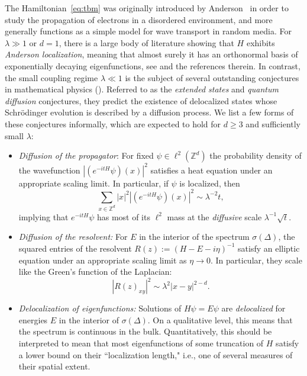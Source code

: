 \documentclass[11pt]{amsart}
\def\bbZ{{\mathbb Z}}
\def\Z{{\mathbb{Z}}}
\numberwithin{equation}{section}
\numberwithin{theorem}{section}
\begin{document}
The Hamiltonian~\eqref{eq:tbm} was originally introduced by Anderson~\cite{anderson1958absence} in order to study the propagation of electrons in a disordered environment, and more generally functions as a simple model for wave transport in random media. For $\lambda\gg 1$ or $d=1$, there is a large body of literature showing that $H$ exhibits \textit{Anderson localization}, meaning that almost surely it has an orthonormal basis of exponentially decaying eigenfunctions, see \cite{aizenman2015random} and the references therein.
In contrast, the small coupling regime $\lambda\ll 1$ is the subject of several outstanding conjectures in mathematical physics (\cite{simon1984fifteen,simon2000schrodinger}).
Referred to as the \emph{extended states} and \emph{quantum diffusion} conjectures, they predict the existence of delocalized states whose Schr\"{o}dinger evolution is described by a diffusion process.
We list a few forms of these conjectures informally,
which are expected to hold for $d\geq 3$ and sufficiently small $\lambda$:
\begin{itemize}
\item \emph{Diffusion of the propagator}: For fixed $\psi\in\ell^2(\bbZ^d)$ the probability density of the wavefunction $|(e^{-itH}\psi)(x)|^{2}$ satisfies a heat equation under an appropriate scaling limit.
In particular, if $\psi$ is localized, then
\begin{equation}
\label{eq:dynamical-deloc}
\sum_{x\in\Z^d} |x|^2 |(e^{-itH} \psi)(x)|^2 \sim \lambda^{-2}t ,
\end{equation}
implying that $e^{-itH}\psi$ has most of its $\ell^2$ mass at the \textit{diffusive} scale $\lambda^{-1}\sqrt{t}.$
\item \emph{Diffusion of the resolvent:}
For $E$ in the interior of the spectrum $\sigma(\Delta)$, the squared entries of the resolvent $R(z):=(H-E-i\eta)^{-1}$ satisfy an elliptic equation under an appropriate scaling limit as $\eta\to 0$.  In particular, they scale like the Green's function of the Laplacian:
\begin{equation}
\label{eq:resolvent-scaling-intro}
|R(z)_{xy}|^2 \sim\lambda^2 |x-y|^{2-d}.
\end{equation}
\item \emph{Delocalization of eigenfunctions:} Solutions of $H\psi = E\psi$ are \textit{delocalized} for energies $E$ in the interior of $\sigma(\Delta)$.
On a qualitative level, this means that the spectrum is continuous in the bulk.
Quantitatively, this should be interpreted to mean that most eigenfunctions of some truncation of $H$ satisfy a lower bound on their ``localization length,"
i.e., one of several measures of their spatial extent.
\end{itemize}
\end{document}
